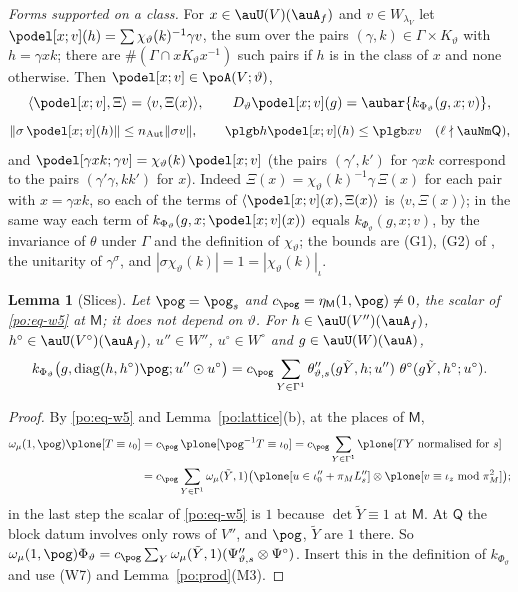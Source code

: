 \documentclass[10pt]{amsart}
\newtheorem{lemma}[theorem]{Lemma}
\theoremstyle{definition}
\theoremstyle{remark}
\begin{document}
\emph{Forms supported on a class.} For $x\in\auU(V)(\auA_f)$ and $v\in W_{\lambda_V}$ let
$\podel[x;v](h)=\sum\chi_\vartheta(k)^{-1}\gamma v$, the sum over the pairs $(\gamma,k)\in\Gamma\times
K_\vartheta$ with $h=\gamma xk$; there are $\#(\Gamma\cap xK_\vartheta x^{-1})$ such pairs if $h$
is in the class of $x$ and none otherwise. Then $\podel[x;v]\in\poA(V;\vartheta)$,
\begin{equation}\label{po:eq-delta}
\langle\podel[x;v],\Xi\rangle=\langle v,\Xi(x)\rangle,\qquad
D_\vartheta\podel[x;v](g)=\aubar{k_{\Phi_\vartheta}(g,x;v)},
\end{equation}
\begin{equation}\label{po:eq-deltasize}
\|\sigma\,\podel[x;v](h)\|\le n_{\mathrm{Aut}}\|\sigma v\|,\qquad\plgb h{\podel[x;v](h)}\le\plgb xv
\quad(\ell\nmid\auNm\mathsf Q),
\end{equation}
and $\podel[\gamma xk;\gamma v]=\chi_\vartheta(k)\,\podel[x;v]$ (the pairs $(\gamma',k')$ for $\gamma xk$ correspond to the pairs $(\gamma'\gamma,kk')$ for $x$). Indeed
$\Xi(x)=\chi_\vartheta(k)^{-1}\gamma\,\Xi(x)$ for each pair with $x=\gamma xk$, so each of the terms of
$\langle\podel[x;v](x),\Xi(x)\rangle$ is $\langle v,\Xi(x)\rangle$; in the same way each term of
$k_{\Phi_\vartheta}(g,x;\podel[x;v](x))$ equals $k_{\Phi_\vartheta}(g,x;v)$, by the invariance of
$\theta$ under $\Gamma$ and the definition of $\chi_\vartheta$; the bounds are (G1), (G2) of
{\cite[\S6.1]{P49}}, the unitarity of $\gamma^\sigma$, and $|\sigma\chi_\vartheta(k)|=1=|\chi_\vartheta
(k)|_\iota$.

\begin{lemma}[Slices]\label{po:slice}
Let $\pog=\pog_s$ and $c_\pog=\eta_{\mathsf M}(1,\pog)\ne0$, the scalar of \eqref{po:eq-w5} at
$\mathsf M$; it does not depend on $\vartheta$. For $h\in\auU(V'')(\auA_f)$, $h^\circ\in
\auU(V^\circ)(\auA_f)$, $u''\in W''$, $u^\circ\in W^\circ$ and $g\in\auU(W)(\auA)$,
\[
k_{\Phi_\vartheta}\bigl(g,\operatorname{diag}(h,h^\circ)\pog;u''\odot u^\circ\bigr)=c_\pog\sum_{Y\in
\Gamma^1}\theta''_{\vartheta,s}(g\tilde Y,h;u'')\ \theta^\circ(g\tilde Y,h^\circ;u^\circ).
\]
\end{lemma}
\begin{proof}
By \eqref{po:eq-w5} and Lemma~\ref{po:lattice}(b), at the places of $\mathsf M$,
\begin{align*}
\omega_\mu(1,\pog)\plone[T\equiv\iota_0]&=c_\pog\,\plone[\pog^{-1}T\equiv\iota_0]=c_\pog\sum_{Y\in
\Gamma^1}\plone[TY\text{ normalised for }s]\\
&=c_\pog\sum_{Y\in\Gamma^1}\omega_\mu(\tilde Y,1)\bigl(\plone[u\in
\iota_0''+\pi_ML''_s]\otimes\plone[v\equiv\iota_z\bmod\pi_M^2]\bigr);
\end{align*}
in the last step the scalar of \eqref{po:eq-w5} is $1$ because $\det\tilde Y\equiv1$ at
$\mathsf M$. At $\mathsf Q$ the block datum involves only rows of $V''$, and $\pog$, $\tilde Y$
are $1$ there. So $\omega_\mu(1,\pog)\Phi_\vartheta=c_\pog\sum_Y\omega_\mu(\tilde Y,1)(\Psi''_{
\vartheta,s}\otimes\Psi^\circ)$. Insert this in the definition of $k_{\Phi_\vartheta}$ and use
(W7) and Lemma~\ref{po:prod}(M3).
\end{proof}
\end{document}
